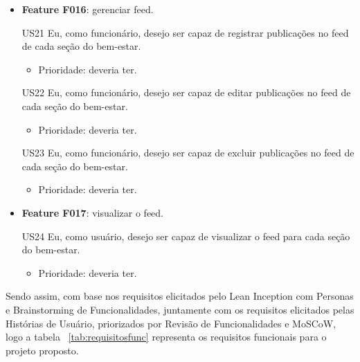 \begin{itemize}
    \item \textbf{Feature F016}: gerenciar feed.

    US21 Eu, como funcionário, desejo ser capaz de registrar publicações no feed de cada seção do bem-estar.

    \begin{itemize}
        \item Prioridade: deveria ter.
    \end{itemize}

    US22 Eu, como funcionário, desejo ser capaz de editar publicações no feed de cada seção do bem-estar.

    \begin{itemize}
        \item Prioridade: deveria ter.
    \end{itemize}

    US23 Eu, como funcionário, desejo ser capaz de excluir publicações no feed de cada seção do bem-estar.

    \begin{itemize}
        \item Prioridade: deveria ter.
    \end{itemize}

    \item \textbf{Feature F017}: visualizar o feed.

    US24 Eu, como usuário, desejo ser capaz de visualizar o feed para cada seção do bem-estar.
    
    \begin{itemize}
        \item Prioridade: deveria ter.
    \end{itemize}

\end{itemize}

Sendo assim, com base nos requisitos elicitados pelo Lean Inception com Personas e Brainstorming de Funcionalidades, juntamente com os requisitos elicitados pelas Histórias de Usuário, priorizados por Revisão de Funcionalidades e MoSCoW, logo a tabela ~\ref{tab:requisitosfunc} representa os requisitos funcionais para o projeto proposto.


